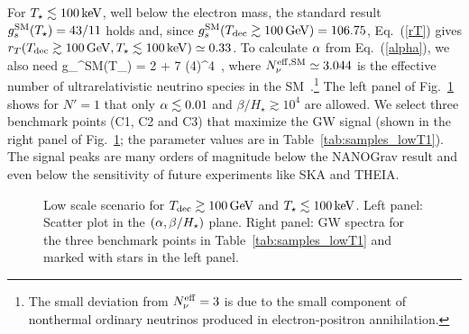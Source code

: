 \documentclass[a4paper,11pt]{article}
\begin{document}
For $T_\star \lesssim 100\,{\rm keV}$, well below the electron mass, the standard result
$g^{\rm SM}_s(T_\star) = 43/11$ holds and, since $g^{\rm SM}_s(T_{\rm dec} \gtrsim 100\,{\rm GeV}) = 106.75$,
 Eq.~(\ref{rT}) gives $r_T(T_{\rm dec} \gtrsim 100\,{\rm GeV},T_\star \lesssim 100\,{\rm keV}) \simeq 0.33$.
To calculate  $\alpha$ from Eq.~(\ref{alpha}), we also need 
\be
g_\rho^{\rm SM}(T_\star) = 2 + {7}  \times \left({4}\right)^{4}  \,,
\ee
 where  $N_{\nu}^{\rm eff, SM} \simeq 3.044$
is the effective number of ultrarelativistic neutrino species in the SM~\cite{Bennett:2020zkv,Akita:2020szl}.\footnote{The small 
deviation from $N_{\nu}^{\rm eff} = 3$ is due to the small component of nonthermal ordinary neutrinos produced in electron-positron annihilation.}
The left panel of Fig.~\ref{f4} shows for $N' =1$ 
that only $\alpha \lesssim 0.01$ and $\beta/H_\star \gtrsim 10^4$ are allowed. We select three benchmark points (C1, C2 and C3) that maximize the GW signal (shown in the right panel of Fig.~\ref{f4}; the parameter values are in Table~\ref{tab:samples_lowT1}).
 The signal peaks are many orders of magnitude
below the NANOGrav result and even below the sensitivity of future experiments like SKA and THEIA.
\begin{figure}
\begin{center}
\hspace{2mm}
\end{center}
\caption{Low scale scenario for $T_{\rm dec} \gtrsim 100\,{\rm GeV}$
and $T_{\star} \lesssim 100\,{\rm keV}$. Left panel: Scatter plot in the $(\alpha, \beta/H_\star)$ plane.
 Right panel: GW spectra for the three benchmark points in Table~\ref{tab:samples_lowT1} and marked with stars in the left panel.}
\label{f4}
\end{figure}
\end{document}
